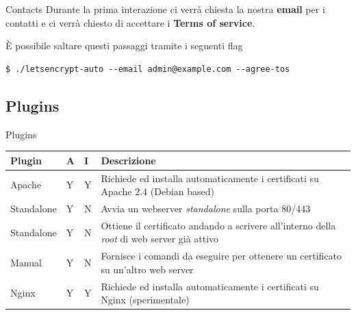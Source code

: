 \documentclass[xcolor=svgnames,11pt]{beamer}
\begin{document}
\begin{frame}[fragile]{Contacts}
Durante la prima interazione ci verrà chiesta la nostra \textbf{email} per i contatti
e ci verrà chiesto di accettare i \textbf{Terms of service}.

\medskip\pause

È possibile saltare questi passaggi tramite i seguenti flag

\medskip

\begin{block}{}
\begin{scriptsize}
\begin{verbatim}
$ ./letsencrypt-auto --email admin@example.com --agree-tos
\end{verbatim}
\end{scriptsize}
\end{block}
\end{frame}

\subsection{Plugins}
\begin{frame}{Plugins}
\begin{center}
\begin{tabular}{p{2cm}p{0.5cm}p{0.5cm}p{5cm}}
\hline
\textbf{Plugin} & \textbf{A} & \textbf{I} & \textbf{Descrizione}\\
\hline
Apache & Y & Y & {\scriptsize Richiede ed installa automaticamente i certificati su Apache 2.4 (Debian based)} \\
Standalone & Y & N & {\scriptsize Avvia un webserver \emph{standalone} sulla porta 80/443} \\
Standalone & Y & N & {\scriptsize Ottiene il certificato andando a scrivere all'interno della \emph{root} di web server già attivo}\\
Manual & Y & N & {\scriptsize Fornisce i comandi da eseguire per ottenere un certificato su un'altro web server} \\
Nginx & Y & Y & {\scriptsize Richiede ed installa automaticamente i certificati su Nginx (sperimentale)} \\
\hline
\end{tabular}
\end{center}
\end{frame}
\end{document}
